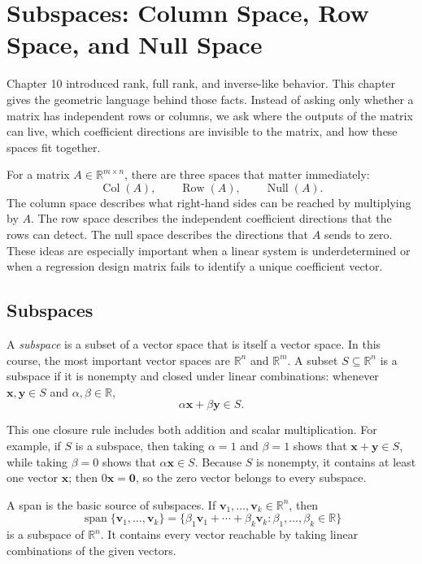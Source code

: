\chapter{Subspaces: Column Space, Row Space, and Null Space}
\label{mf:ch11-subspaces-column-row-null}

Chapter 10 introduced rank, full rank, and inverse-like behavior. This chapter gives the geometric language behind those facts. Instead of asking only whether a matrix has independent rows or columns, we ask where the outputs of the matrix can live, which coefficient directions are invisible to the matrix, and how these spaces fit together.

For a matrix \(A\in\mathbb{R}^{m\times n}\), there are three spaces that matter immediately:
\[
    \operatorname{Col}(A),\qquad
    \operatorname{Row}(A),\qquad
    \operatorname{Null}(A).
\]
The column space describes what right-hand sides can be reached by multiplying by \(A\). The row space describes the independent coefficient directions that the rows can detect. The null space describes the directions that \(A\) sends to zero. These ideas are especially important when a linear system is underdetermined or when a regression design matrix fails to identify a unique coefficient vector.

\section{Subspaces}
\label{mf:subspaces}

A \emph{subspace} is a subset of a vector space that is itself a vector space. In this course, the most important vector spaces are \(\mathbb{R}^n\) and \(\mathbb{R}^m\). A subset \(S\subseteq \mathbb{R}^n\) is a subspace if it is nonempty and closed under linear combinations: whenever \(\mathbf{x},\mathbf{y}\in S\) and \(\alpha,\beta\in\mathbb{R}\),
\[
    \alpha\mathbf{x}+\beta\mathbf{y}\in S.
\]

This one closure rule includes both addition and scalar multiplication. For example, if \(S\) is a subspace, then taking \(\alpha=1\) and \(\beta=1\) shows that \(\mathbf{x}+\mathbf{y}\in S\), while taking \(\beta=0\) shows that \(\alpha\mathbf{x}\in S\). Because \(S\) is nonempty, it contains at least one vector \(\mathbf{x}\); then \(0\mathbf{x}=\mathbf{0}\), so the zero vector belongs to every subspace.

A span is the basic source of subspaces. If \(\mathbf{v}_1,\ldots,\mathbf{v}_k\in\mathbb{R}^n\), then
\[
    \operatorname{span}\{\mathbf{v}_1,
    \ldots,\mathbf{v}_k\}
    =\{\beta_1\mathbf{v}_1+\cdots+\beta_k\mathbf{v}_k:
    \beta_1,
    \ldots,\beta_k\in\mathbb{R}\}
\]
is a subspace of \(\mathbb{R}^n\). It contains every vector reachable by taking linear combinations of the given vectors.

